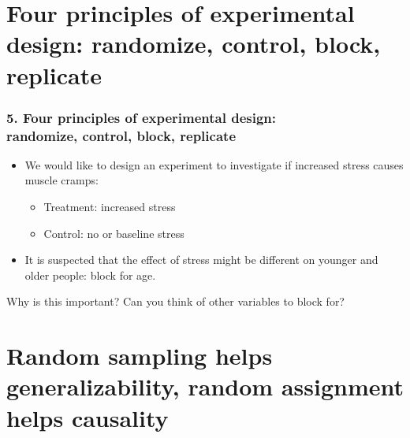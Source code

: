 \documentclass[11pt]{beamer}
\begin{document}

\section{Four principles of experimental design: randomize, control, block, replicate}
\label{mi5}


\begin{frame}
\frametitle{5. Four principles of experimental design:\\ randomize, control, block, 
replicate}

\begin{itemize}
\item We would like to design an experiment to investigate if increased stress causes 
muscle cramps:

\pause

\begin{itemize}
\item Treatment: increased stress
\item Control: no or baseline stress
\end{itemize}

\pause

\item It is suspected that the effect of stress might be different on younger and older 
people: \alert{block} for age.

\end{itemize}

\pause

\begin{alertblock}{Why is this important? Can you think of other variables to block for?}\end{alertblock}

\end{frame}


\section{Random sampling helps generalizability, random assignment helps causality}
\label{mi6}

\end{document}
